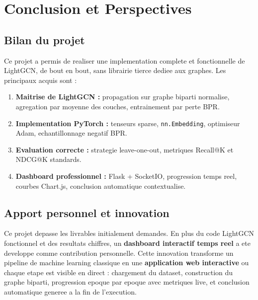 \documentclass[12pt,a4paper]{report}
\begin{document}
\chapter{Conclusion et Perspectives}

\section{Bilan du projet}

Ce projet a permis de realiser une implementation complete et
fonctionnelle de LightGCN, de bout en bout, sans librairie tierce
dediee aux graphes. Les principaux acquis sont :

\begin{enumerate}[label=\textbf{\arabic*.}]
  \item \textbf{Maitrise de LightGCN :} propagation sur graphe
    biparti normalise, agregation par moyenne des couches,
    entrainement par perte BPR.

  \item \textbf{Implementation PyTorch :} tenseurs sparse,
    \texttt{nn.Embedding}, optimiseur Adam, echantillonnage
    negatif BPR.

  \item \textbf{Evaluation correcte :} strategie leave-one-out,
    metriques Recall@K et NDCG@K standards.

  \item \textbf{Dashboard professionnel :} Flask + SocketIO,
    progression temps reel, courbes Chart.js, conclusion
    automatique contextualise.
\end{enumerate}

\section{Apport personnel et innovation}

Ce projet depasse les livrables initialement demandes.
En plus du code LightGCN fonctionnel et des resultats
chiffres, un \textbf{dashboard interactif temps reel}
a ete developpe comme contribution personnelle. Cette
innovation transforme un pipeline de machine learning
classique en une \textbf{application web interactive}
ou chaque etape est visible en direct : chargement du
dataset, construction du graphe biparti, progression
epoque par epoque avec metriques live, et conclusion
automatique generee a la fin de l'execution.
\end{document}
